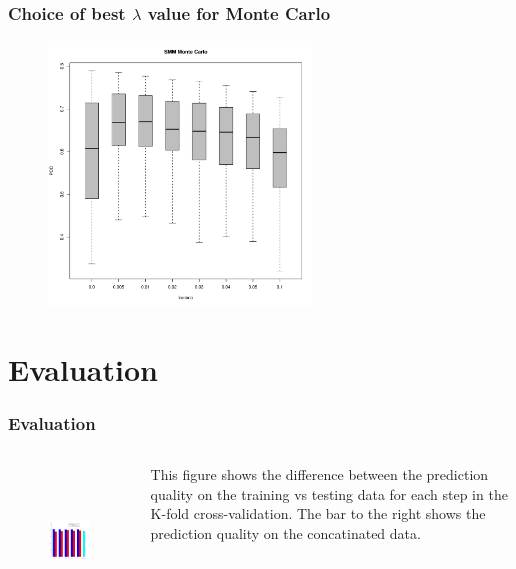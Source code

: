 \documentclass[presentation]{beamer}   %
\begin{document}
\begin{frame}[plain]
  \frametitle{Choice of best $\lambda$ value for Monte Carlo}
	\begin{figure}
		\centering
		\includegraphics[width=70mm,height=70mm]{fig/choice_lambda_mc.pdf}
	\end{figure}
\end{frame}
\section{Evaluation}
\begin{frame}
  \frametitle{Evaluation}
  \begin{columns}[t] %
		\begin{figure}
		\centering
			\includegraphics[width=40mm,height=40mm]{fig/barplot.pdf}
		\end{figure}
		\centering
		\begin{block}\centering
		This figure shows the difference between the prediction quality on the training vs testing data for each step in the K-fold cross-validation. The bar to the right shows the prediction quality on the concatinated data.
		\end{block}
  \end{columns}

\end{frame}
\end{document}

